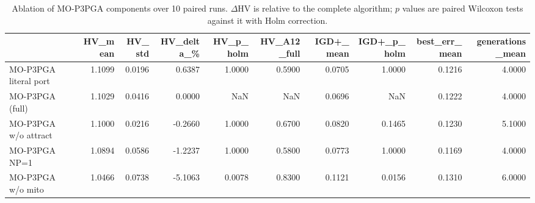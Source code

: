 \begin{table}[htbp]
\centering
\caption{Ablation of MO-P3PGA components over 10 paired runs. $\Delta$HV is relative to the complete algorithm; $p$ values are paired Wilcoxon tests against it with Holm correction.}
\label{tab:ablation}
\footnotesize
\begin{tabular}{lrrrrrrrrr}
\toprule
 & HV\_mean & HV\_std & HV\_delta\_\% & HV\_p\_holm & HV\_A12\_full & IGD+\_mean & IGD+\_p\_holm & best\_err\_mean & generations\_mean \\
\midrule
MO-P3PGA literal port & 1.1099 & 0.0196 & 0.6387 & 1.0000 & 0.5900 & 0.0705 & 1.0000 & 0.1216 & 4.0000 \\
MO-P3PGA (full) & 1.1029 & 0.0416 & 0.0000 & NaN & NaN & 0.0696 & NaN & 0.1222 & 4.0000 \\
MO-P3PGA w/o attract & 1.1000 & 0.0216 & -0.2660 & 1.0000 & 0.6700 & 0.0820 & 0.1465 & 0.1230 & 5.1000 \\
MO-P3PGA NP=1 & 1.0894 & 0.0586 & -1.2237 & 1.0000 & 0.5800 & 0.0773 & 1.0000 & 0.1169 & 4.0000 \\
MO-P3PGA w/o mito & 1.0466 & 0.0738 & -5.1063 & 0.0078 & 0.8300 & 0.1121 & 0.0156 & 0.1310 & 6.0000 \\
\bottomrule
\end{tabular}
\end{table}
